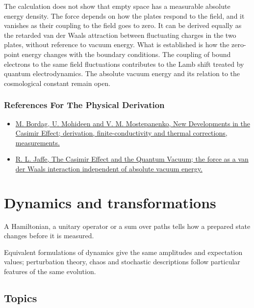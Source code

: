 \documentclass[11pt,oneside]{book}
\begin{document}
The calculation does not show that empty space has a measurable absolute energy density. The force depends on how the plates respond to the field, and it vanishes as their coupling to the field goes to zero. It can be derived equally as the retarded van der Waals attraction between fluctuating charges in the two plates, without reference to vacuum energy. What is established is how the zero-point energy changes with the boundary conditions. The coupling of bound electrons to the same field fluctuations contributes to the Lamb shift treated by quantum electrodynamics. The absolute vacuum energy and its relation to the cosmological constant remain open.

\subsection*{References For The Physical Derivation}
\begin{itemize}
\item \href{https://arxiv.org/abs/quant-ph/0106045}{M. Bordag, U. Mohideen and V. M. Mostepanenko, New Developments in the Casimir Effect; derivation, finite-conductivity and thermal corrections, measurements.}
\item \href{https://arxiv.org/abs/hep-th/0503158}{R. L. Jaffe, The Casimir Effect and the Quantum Vacuum; the force as a van der Waals interaction independent of absolute vacuum energy.}
\end{itemize}





\chapter{Dynamics and transformations}

\begin{claimbox}

A Hamiltonian, a unitary operator or a sum over paths tells how a prepared state changes before it is measured.

\end{claimbox}

Equivalent formulations of dynamics give the same amplitudes and expectation values; perturbation theory, chaos and stochastic descriptions follow particular features of the same evolution.

\section*{Topics}
\end{document}
